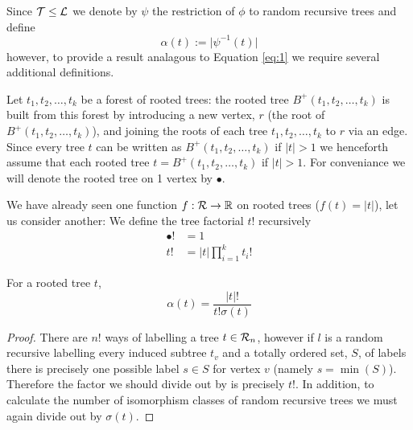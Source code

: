 Since $\operatorname{\mathcal{T}} \leq \operatorname{\mathcal{L}}$ we denote by $\psi$ the restriction of $\phi$ to random recursive trees and define
\[
 \alpha(t) := \lvert \psi^{-1}(t) \rvert 
\]
however, to provide a result analagous to Equation \ref{eq:1} we require several additional definitions. 

Let $t_1,t_2,\dots,t_k$ be a forest of rooted trees: the rooted tree $B^{+}(t_1,t_2,\dots,t_k)$ is built from this forest by 
introducing a new vertex, $r$ (the root of $B^{+}(t_1,t_2,\dots,t_k)$), and joining the roots of each tree $t_1,t_2,\dots,t_k$ 
to $r$ via an edge.  Since every tree $t$ can be written as $B^{+}(t_1,t_2,\dots,t_k)$ if $\lvert t \rvert > 1$ we henceforth 
assume that each rooted tree $t = B^{+}(t_1,t_2,\dots,t_k)$ if $\lvert t \rvert >1$.  For conveniance we will denote the rooted tree on 1 vertex 
by $\bullet$.


We have already seen one function $f: \operatorname{\mathcal{R}} \rightarrow \mathbb{R}$ on rooted trees ($f(t) = \lvert t \rvert$), let us consider 
another: We define the tree factorial $t!$ recursively
\begin{align}
 \bullet! &=  1  \\
 t ! &= \lvert t \rvert \prod_{i=1}^k t_i !
\end{align}

\begin{ex}
\end{ex}

\begin{lem}\label{lem:alpha}
For a rooted tree $t$,
 \begin{equation}\label{eq:2}
\alpha(t) = \frac{\lvert t \rvert !}{t!\sigma(t)}
 \end{equation}
\end{lem}


\begin{proof}
 There are $n!$ ways of labelling a tree $t \in \operatorname{\mathcal{R}}_n$, however if $l$ is a random recursive labelling every induced subtree 
 $t_v$ and a totally ordered set, $S$, of labels there is precisely one possible label $s \in S$ for vertex $v$ (namely $s = \min(S)$).  
 Therefore the factor we should divide out by is precisely $t!$.  In addition, to calculate the number of isomorphism classes of 
 random recursive trees we must again divide out by $\sigma(t)$.
\end{proof}

